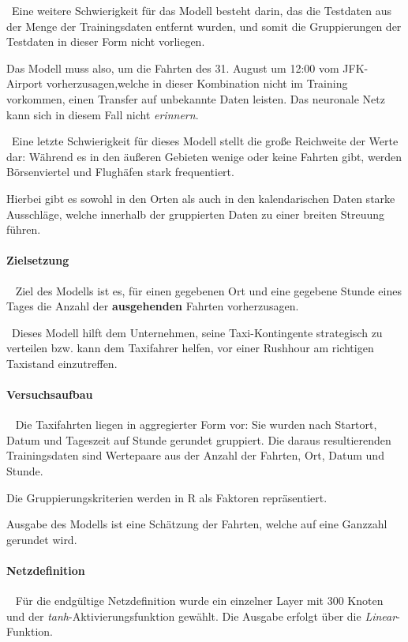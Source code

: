 ~\newline Eine weitere Schwierigkeit für das Modell besteht darin, das die Testdaten aus der Menge der Trainingsdaten entfernt wurden, und somit die Gruppierungen der Testdaten in dieser Form nicht vorliegen. 

Das Modell muss also, um die Fahrten des 31. August um 12:00 vom JFK-Airport vorherzusagen,welche in dieser Kombination nicht im Training vorkommen, einen Transfer auf unbekannte Daten leisten. Das neuronale Netz kann sich in diesem Fall nicht \textit{erinnern}.

~\newline Eine letzte Schwierigkeit für dieses Modell stellt die große Reichweite der Werte dar: Während es in den äußeren Gebieten wenige oder keine Fahrten gibt, werden Börsenviertel und Flughäfen stark frequentiert. 

Hierbei gibt es sowohl in den Orten als auch in den kalendarischen Daten starke Ausschläge, welche innerhalb der gruppierten Daten zu einer breiten Streuung führen.
\paragraph{Zielsetzung} ~\newline
Ziel des Modells ist es, für einen gegebenen Ort und eine gegebene Stunde eines Tages die Anzahl der \textbf{ausgehenden} Fahrten vorherzusagen. 

~\newline Dieses Modell hilft dem Unternehmen, seine Taxi-Kontingente strategisch zu verteilen bzw. kann dem Taxifahrer helfen, vor einer Rushhour am richtigen Taxistand einzutreffen. 
\paragraph{Versuchsaufbau} ~\newline
Die Taxifahrten liegen in aggregierter Form vor: Sie wurden nach Startort, Datum und Tageszeit auf Stunde gerundet gruppiert. Die daraus resultierenden Trainingsdaten sind Wertepaare aus der Anzahl der Fahrten, Ort, Datum und Stunde. 

Die Gruppierungskriterien werden in R als Faktoren repräsentiert. 

Ausgabe des Modells ist eine Schätzung der Fahrten, welche auf eine Ganzzahl gerundet wird. 

\paragraph{Netzdefinition} ~\newline
Für die endgültige Netzdefinition wurde ein einzelner Layer mit 300 Knoten und der \textit{tanh}-Aktivierungsfunktion gewählt. Die Ausgabe erfolgt über die \textit{Linear}-Funktion.

